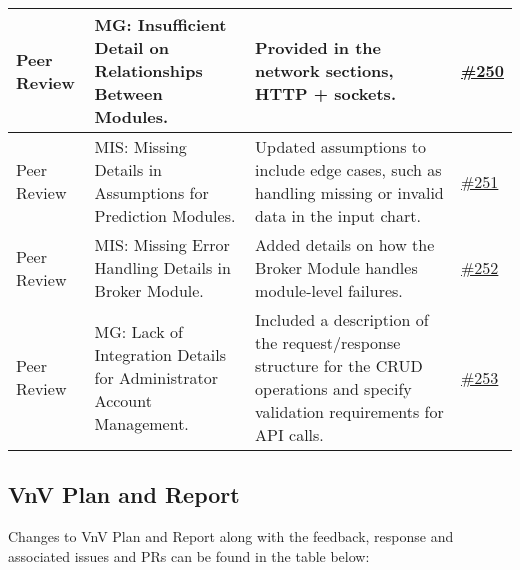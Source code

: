 \documentclass{article}
\begin{document}
\begin{longtable}{| p{} | p{} | p{} | p{} |}
    \hline
    Peer Review & MG: Insufficient Detail on Relationships Between Modules.  & Provided in the network sections, HTTP + sockets. & \href{https://github.com/PKALXI/RapidCare/issues/250}{\#250} \\
    \hline
    Peer Review & MIS: Missing Details in Assumptions for Prediction Modules. & Updated assumptions to include edge cases, such as handling missing or invalid data in the input chart. & \href{https://github.com/PKALXI/RapidCare/issues/251}{\#251} \\
    \hline
    Peer Review & MIS: Missing Error Handling Details in Broker Module. & Added details on how the Broker Module handles module-level failures. & \href{https://github.com/PKALXI/RapidCare/issues/252}{\#252} \\
    \hline
    Peer Review & MG: Lack of Integration Details for Administrator Account Management. & Included a description of the request/response structure for the CRUD operations and specify validation requirements for API calls. & \href{https://github.com/PKALXI/RapidCare/issues/253}{\#253} \\
    \hline
\end{longtable}

\subsection{VnV Plan and Report}

Changes to VnV Plan and Report along with the feedback, response and associated issues and PRs can be found in the table below: 
\end{document}
